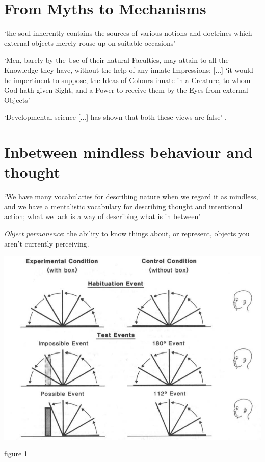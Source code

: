 \documentclass[12pt]{extarticle}
\begin{document}
\begin{multicols}{3}
 
 
\section{From Myths to Mechanisms}
 
‘the soul inherently contains the sources of various notions and doctrines which external objects merely rouse up on suitable occasions’
\citep[p.\ 48]{Leibniz:1996bl}
 
‘Men, barely by the Use of their natural Faculties, may attain to all the Knowledge they have, without the help of any innate Impressions; [...]
‘it would be impertinent to suppose, the Ideas of Colours innate in a Creature, to whom God hath given Sight, and a Power to receive them by the Eyes from external Objects’
\citep[p.\ 48]{Locke:1975qo}
 
‘Developmental science [...] has shown that both these views are false’
\citep[p.\ 89]{Spelke:2007hb}.
 
 
 
\section{Inbetween mindless behaviour and thought}
 
‘We have many vocabularies for describing nature when we regard it as mindless, and we have a mentalistic vocabulary for describing thought and intentional action; what we lack is a way of describing what is in between’ \citep[p.\ 11]{Davidson:1999ju}
 
\textit{Object permanence}:
the ability to know things about, or represent, objects you aren't currently perceiving.
 
\begin{center}
\includegraphics[scale=0.3]{../www.slides/src/files/img/baillargeon_1987_fig1.neg.png}
\end{center}
\begin{center} \citealp{baillargeon:1987_object} figure 1 \end{center}
 

\end{multicols}
\end{document}
